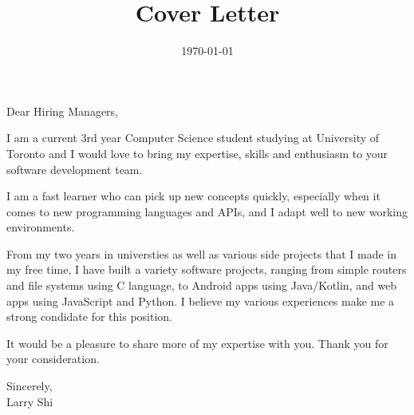 \documentclass[12pt]{article}
\title{Cover Letter}
\author{}
\date{\today}
\begin{document}
\maketitle\vspace{-2\baselineskip}

Dear Hiring Managers,

I am a current 3rd year Computer Science student studying at University of Toronto and I would love to bring my expertise, skills and enthusiasm to your software development team.

I am a fast learner who can pick up new concepts quickly, especially when it comes to new programming languages and APIs, and I adapt well to new working environments.

From my two years in universties as well as various side projects that I made in my free time, I have built a variety software projects, ranging from simple routers and file systems using C language, to Android apps using Java/Kotlin, and web apps using JavaScript and Python. I believe my various experiences make me a strong condidate for this position.

It would be a pleasure to share more of my expertise with you. Thank you for your consideration.

Sincerely, \\
Larry Shi
\end{document}
